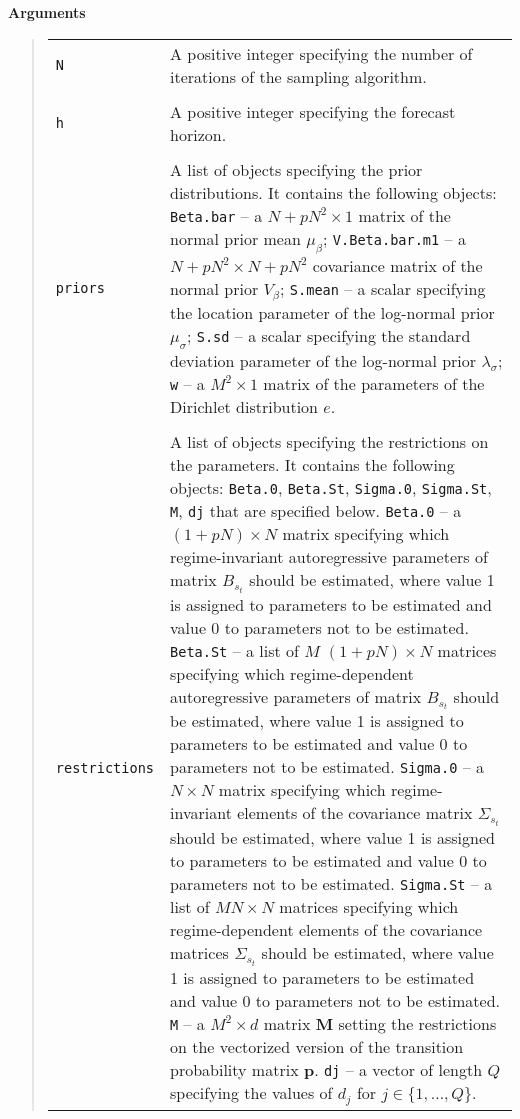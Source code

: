 \documentclass[final,3p,authoryear]{elsarticle}
\begin{document}
\bigskip\noindent\textbf{Arguments}
\begin{quote}
\begin{tabular}{p{3cm}p{10cm}}
\texttt{N} & A positive integer specifying the number of iterations of the sampling algorithm. \\
&\\
\texttt{h}& A  positive integer specifying the forecast horizon.\\
&\\
\texttt{priors}& A list of objects specifying the prior distributions. It contains the following objects:
\texttt{Beta.bar} -- a $N+pN^2\times 1$ matrix of the normal prior mean $\mu_\beta$;
\texttt{V.Beta.bar.m1} -- a $N+pN^2\times N+pN^2$ covariance matrix of the normal prior $V_\beta$;
\texttt{S.mean} -- a scalar specifying the location parameter of the log-normal prior $\mu_\sigma$;
\texttt{S.sd} -- a scalar specifying the standard deviation parameter of the log-normal prior $\lambda_\sigma$;
\texttt{w} -- a $M^2\times 1$ matrix of the parameters of the Dirichlet distribution $e$.
\\
&\\
\texttt{restrictions}& A list of objects specifying the restrictions on the parameters. It contains the following objects: \texttt{Beta.0}, \texttt{Beta.St}, \texttt{Sigma.0}, \texttt{Sigma.St}, \texttt{M}, \texttt{dj} that are specified below.
\linebreak \texttt{Beta.0} -- a $(1+pN)\times N$ matrix specifying which regime-invariant autoregressive parameters of matrix $B_{s_t}$ should be estimated, where value 1 is assigned to parameters to be  estimated and value 0 to parameters not to be estimated. 
\texttt{Beta.St} -- a list of $M$ $(1+pN)\times N$ matrices specifying which regime-dependent autoregressive parameters of matrix $B_{s_t}$ should be estimated, where value 1 is assigned to parameters to be  estimated and value 0 to parameters not to be estimated.  
\texttt{Sigma.0} -- a $N\times N$ matrix specifying which regime-invariant elements of the covariance matrix $\Sigma_{s_t}$ should be estimated, where value 1 is assigned to parameters to be  estimated and value 0 to parameters not to be estimated. 
\texttt{Sigma.St} -- a list of $M$$N\times N$ matrices specifying which regime-dependent elements of the covariance matrices $\Sigma_{s_t}$ should be estimated, where value 1 is assigned to parameters to be  estimated and value 0 to parameters not to be estimated. 
\texttt{M} -- a $M^2\times d$ matrix $\mathbf{M}$ setting the restrictions on the vectorized version of the transition probability matrix $\mathbf{p}$. 
\texttt{dj} -- a vector of length $Q$ specifying the values of $d_j$ for $j\in\{1,\dots,Q\}$.
\end{tabular}
\end{quote}
\end{document}
